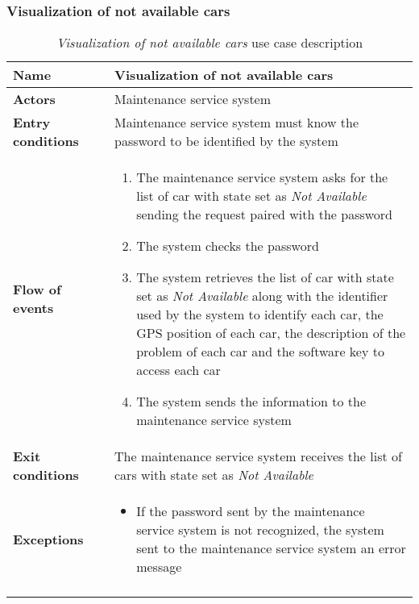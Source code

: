 \clearpage
\subsubsection{Visualization of not available cars}
\begin{longtable}{p{0.25\linewidth}p{0.75\linewidth}}
\toprule
\textbf{Name} & \textbf{Visualization of not available cars} \\
\midrule
\textbf{Actors} &  Maintenance service system\\
\midrule
\textbf{Entry conditions} & Maintenance service system must know the password to be identified by the system\\
\midrule
\textbf{Flow of events} & 
\begin{enumerate}
	\item The maintenance service system asks for the list of car with state set as \emph{Not Available} sending the request
	paired with the  password
	\item The system checks the password
	\item The system retrieves the list of car with state set as \emph{Not Available} along with the identifier used by the system to identify each car, the GPS position of each car, the description of the problem of each car and the software key to access each car
	\item The system sends the information to the maintenance service system
\end{enumerate} \\
\midrule
\textbf{Exit conditions} & The maintenance service system receives the list of cars with state set as \emph{Not Available} \\
\midrule
\textbf{Exceptions} & 
\begin{itemize}
	\item If the password sent by the maintenance service system is not recognized, the system sent to the maintenance service system an error message
\end{itemize} \\
\bottomrule
\caption{\emph{Visualization of not available cars} use case description}
\end{longtable}

\clearpage
